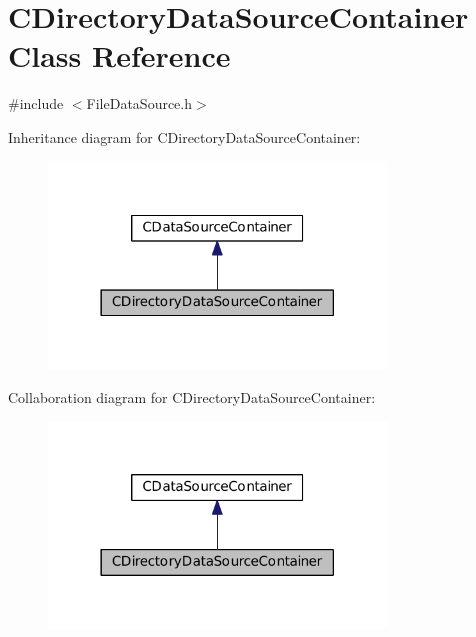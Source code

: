 \hypertarget{classCDirectoryDataSourceContainer}{}\section{C\+Directory\+Data\+Source\+Container Class Reference}
\label{classCDirectoryDataSourceContainer}


{\ttfamily \#include $<$File\+Data\+Source.\+h$>$}



Inheritance diagram for C\+Directory\+Data\+Source\+Container\+:
\nopagebreak
\begin{figure}[H]
\begin{center}
\leavevmode
\includegraphics[width=254pt]{classCDirectoryDataSourceContainer__inherit__graph}
\end{center}
\end{figure}


Collaboration diagram for C\+Directory\+Data\+Source\+Container\+:
\nopagebreak
\begin{figure}[H]
\begin{center}
\leavevmode
\includegraphics[width=254pt]{classCDirectoryDataSourceContainer__coll__graph}
\end{center}
\end{figure}
